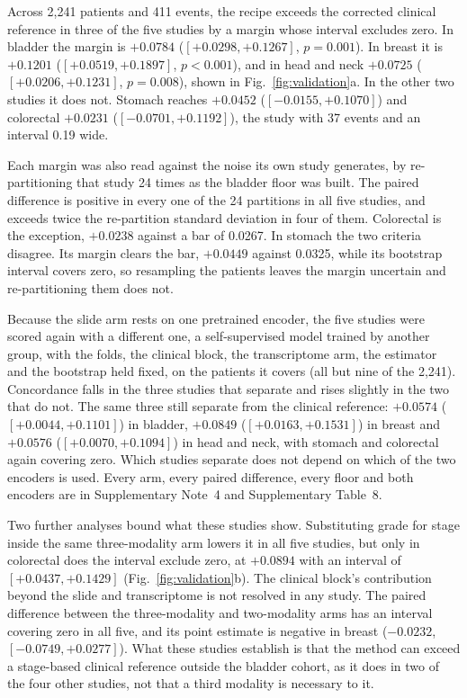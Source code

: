 \documentclass[pdflatex,sn-nature]{sn-jnl}
\begin{document}
Across 2,241 patients and 411 events, the recipe exceeds the corrected clinical reference in three
of the five studies by a margin whose interval excludes zero. In bladder the margin is $+0.0784$
($[+0.0298, +0.1267]$, $p=0.001$). In breast it is $+0.1201$ ($[+0.0519, +0.1897]$, $p<0.001$), and
in head and neck $+0.0725$ ($[+0.0206, +0.1231]$, $p=0.008$), shown in
Fig.~\ref{fig:validation}a. In the other two studies it does not. Stomach reaches $+0.0452$
($[-0.0155, +0.1070]$) and colorectal $+0.0231$ ($[-0.0701, +0.1192]$), the study with 37 events and
an interval 0.19 wide.

Each margin was also read against the noise its own study generates, by re-partitioning that study
24 times as the bladder floor was built. The paired difference is positive in every one of the 24
partitions in all five studies, and exceeds twice the re-partition standard deviation in four of
them. Colorectal is the exception, $+0.0238$ against a bar of 0.0267. In stomach the two criteria
disagree. Its margin clears the bar, $+0.0449$ against 0.0325, while its bootstrap interval covers
zero, so resampling the patients leaves the margin uncertain and re-partitioning them does not.

Because the slide arm rests on one pretrained encoder, the five studies were scored again with a
different one, a self-supervised model trained by another group, with the folds, the clinical block,
the transcriptome arm, the estimator and the bootstrap held fixed, on the patients it covers (all but
nine of the 2,241). Concordance falls in the three
studies that separate and rises slightly in the two that do not. The same three still separate from
the clinical reference: $+0.0574$ ($[+0.0044, +0.1101]$) in bladder, $+0.0849$
($[+0.0163, +0.1531]$) in breast and $+0.0576$ ($[+0.0070, +0.1094]$) in head and neck, with stomach
and colorectal again covering zero. Which studies separate does not depend on which of the two
encoders is used. Every arm, every
paired difference, every floor and both encoders are in Supplementary Note~4 and Supplementary
Table~8.

Two further analyses bound what these studies show. Substituting grade for stage inside the same
three-modality arm lowers it in all five studies, but only in colorectal does the interval exclude
zero, at $+0.0894$ with an interval of $[+0.0437, +0.1429]$ (Fig.~\ref{fig:validation}b). The clinical block's
contribution beyond the slide and transcriptome is not resolved in any study. The paired difference
between the three-modality and two-modality arms has an interval covering zero in all five, and its
point estimate is negative in breast ($-0.0232$, $[-0.0749, +0.0277]$). What these studies establish is that the
method can exceed a stage-based clinical reference outside the bladder cohort, as it does
in two of the four other studies, not that a third modality is necessary to it.
\end{document}

